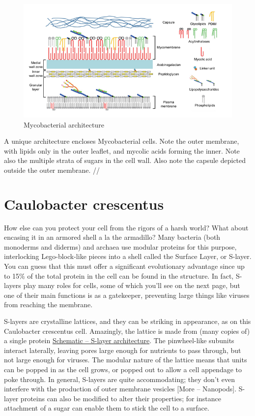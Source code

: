 \documentclass[]{tufte-book}
\begin{document}
\begin{figure}
\includegraphics{img/02_schematic/2_5_1_Mycobacteria} \caption[Mycobacterial architecture]{Mycobacterial architecture}\label{fig:2-5-1}
\end{figure}

A unique architecture encloses Mycobacterial cells. Note the outer
membrane, with lipids only in the outer leaflet, and mycolic acids
forming the inner. Note also the multiple strata of sugars in the cell
wall. Also note the capsule depicted outside the outer membrane. //

\section{Caulobacter crescentus}\label{caulobacter-crescentus}

How else can you protect your cell from the rigors of a harsh world?
What about encasing it in an armored shell a la the armadillo? Many
bacteria (both monoderms and diderms) and archaea use modular proteins
for this purpose, interlocking Lego-block-like pieces into a shell
called the Surface Layer, or S-layer. You can guess that this must offer
a significant evolutionary advantage since up to 15\% of the total
protein in the cell can be found in the structure. In fact, S-layers
play many roles for cells, some of which you'll see on the next page,
but one of their main functions is as a gatekeeper, preventing large
things like viruses from reaching the membrane.

S-layers are crystalline lattices, and they can be striking in
appearance, as on this Caulobacter crescentus cell. Amazingly, the
lattice is made from (many copies of) a single protein
\protect\hyperlink{fig:2-6-1}{Schematic -- S-layer architecture}. The
pinwheel-like subunits interact laterally, leaving pores large enough
for nutrients to pass through, but not large enough for viruses. The
modular nature of the lattice means that units can be popped in as the
cell grows, or popped out to allow a cell appendage to poke through. In
general, S-layers are quite accommodating; they don't even interfere
with the production of outer membrane vesicles {[}More -- Nanopods{]}.
S-layer proteins can also be modified to alter their properties; for
instance attachment of a sugar can enable them to stick the cell to a
surface.
\end{document}
